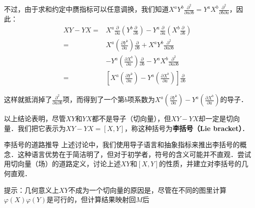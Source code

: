 不过，由于求和约定中赝指标可以任意调换，我们知道$X^aY^b\frac{\partial^2}{\partial a\partial b}=Y^aX^b\frac{\partial^2}{\partial b\partial a}$，因此：
\begin{equation}
\begin{aligned}
XY-YX=&X^a\frac{\partial}{\partial a}(Y^b\frac{\partial}{\partial b})-Y^a\frac{\partial}{\partial a}(X^b\frac{\partial}{\partial b})\\
=&X^a(\frac{\partial Y^b}{\partial a})\frac{\partial}{\partial b}+X^aY^b\frac{\partial^2}{\partial a\partial b}\\&-Y^a(\frac{\partial X^b}{\partial a})\frac{\partial}{\partial b}-Y^aX^b\frac{\partial^2}{\partial a\partial b}\\
=&[X^a(\frac{\partial Y^b}{\partial a})-Y^a(\frac{\partial X^b}{\partial a})]\frac{\partial}{\partial b}
\end{aligned}
\end{equation}

这样就抵消掉了$\frac{\partial^2}{\partial a\partial b}$项，而得到了一个第$b$项系数为$X^a(\frac{\partial Y^b}{\partial a})-Y^a(\frac{\partial X^b}{\partial a})$的导子．

以上结论表明，尽管$XY$和$YX$都不是导子（切向量），但$XY-YX$却一定是切向量．我们把它表示为$XY-YX=[X, Y]$，称这种括号为\textbf{李括号（Lie bracket）}．

\begin{exercise}{李括号的道路推导}
上述讨论中，我们使用导子语言和抽象指标来推出李括号的概念．这种语言优势在于简洁明了，但对于初学者，符号的含义可能并不直观．尝试用切向量（场）的道路定义，讨论上述$XY$和$[X, Y]$的性质，并建立对李括号的几何直观．

提示：几何意义上$XY$不成为一个切向量的原因是，尽管在不同的图里计算$\varphi(X)\varphi(Y)$是可行的，但计算结果映射回$M$后
\end{exercise}




